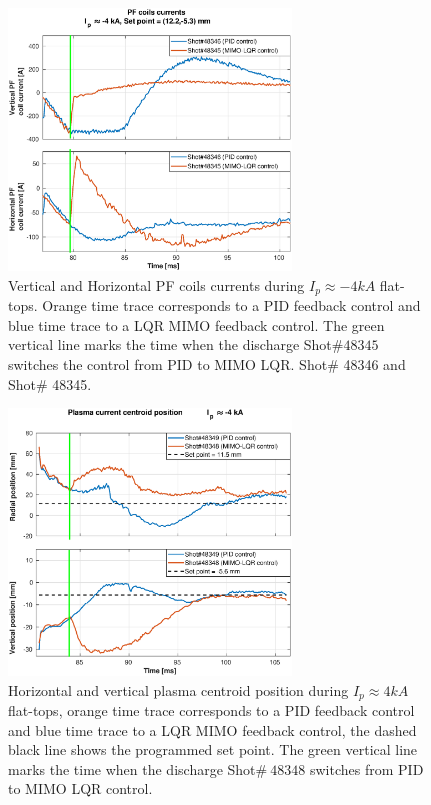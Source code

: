 \begin{figure}
	\centering
	\includegraphics[width=0.67\textwidth]{Chp5/PIDvsMIMO_346_345_curr_2.eps}
	\caption{Vertical and Horizontal PF coils currents during  $I_p\approx -4kA$  flat-tops. Orange time trace corresponds to a PID feedback control and blue time trace to a LQR MIMO feedback control. The green vertical line marks the time  when the  discharge Shot$\# 48345$ switches the control from PID to MIMO LQR.  Shot$\#$  48346 and  Shot$\#$ 48345.}
\end{figure}

\begin{figure}
	\centering
	\includegraphics[width=0.67\textwidth]{Chp5/PIDvsMIMO_349_348_2.eps}
	\caption{Horizontal and vertical plasma centroid position during  $I_p\approx 4kA$  flat-tops, orange time trace corresponds to a PID feedback control and blue time trace to a LQR MIMO feedback control, the dashed black line shows the programmed set point. The green vertical line marks the time  when the  discharge Shot$\# ~48348$ switches  from PID to MIMO LQR control.}
\end{figure}

